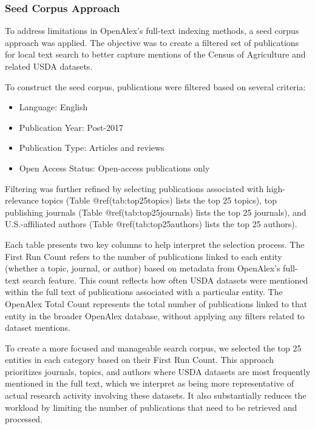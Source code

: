 \documentclass[
  letterpaper,
  DIV=11,
  numbers=noendperiod]{scrartcl}
\begin{document}
\subsubsection{Seed Corpus Approach}\label{seed-corpus-approach}

To address limitations in OpenAlex's full-text indexing methods, a seed
corpus approach was applied. The objective was to create a filtered set
of publications for local text search to better capture mentions of the
Census of Agriculture and related USDA datasets.

To construct the seed corpus, publications were filtered based on
several criteria:

\begin{itemize}
\item Language: English
\item Publication Year: Post-2017
\item Publication Type: Articles and reviews
\item Open Access Status: Open-access publications only
\end{itemize}

Filtering was further refined by selecting publications associated with
high-relevance topics (Table @ref(tab:top25topics) lists the top 25
topics), top publishing journals (Table @ref(tab:top25journals) lists
the top 25 journals), and U.S.-affiliated authors (Table
@ref(tab:top25authors) lists the top 25 authors).

Each table presents two key columns to help interpret the selection
process. The First Run Count refers to the number of publications linked
to each entity (whether a topic, journal, or author) based on metadata
from OpenAlex's full-text search feature. This count reflects how often
USDA datasets were mentioned within the full text of publications
associated with a particular entity. The OpenAlex Total Count represents
the total number of publications linked to that entity in the broader
OpenAlex database, without applying any filters related to dataset
mentions.

To create a more focused and manageable search corpus, we selected the
top 25 entities in each category based on their First Run Count. This
approach prioritizes journals, topics, and authors where USDA datasets
are most frequently mentioned in the full text, which we interpret as
being more representative of actual research activity involving these
datasets. It also substantially reduces the workload by limiting the
number of publications that need to be retrieved and processed.
\end{document}
